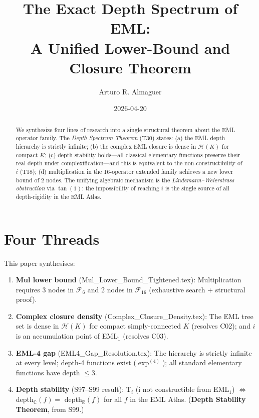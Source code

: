 \documentclass[11pt]{article}
\title{The Exact Depth Spectrum of EML:\\
       A Unified Lower-Bound and Closure Theorem}
\author{Arturo R. Almaguer}
\date{2026-04-20}
\begin{document}
\maketitle

\begin{abstract}
We synthesize four lines of research into a single structural theorem about
the EML operator family.  The \emph{Depth Spectrum Theorem} (T30) states:
(a) the EML depth hierarchy is strictly infinite;
(b) the complex EML closure is dense in $\mathcal{H}(K)$ for compact $K$;
(c) depth stability holds---all classical elementary functions preserve their
real depth under complexification---and this is equivalent to the
non-constructibility of $i$ (T18);
(d) multiplication in the 16-operator extended family achieves a new
lower bound of 2 nodes.
The unifying algebraic mechanism is the \emph{Lindemann--Weierstrass obstruction}
via $\tan(1)$: the impossibility of reaching $i$ is the single source of
all depth-rigidity in the EML Atlas.
\end{abstract}

\section{Four Threads}

This paper synthesises:

\begin{enumerate}
\item \textbf{Mul lower bound} (Mul\_Lower\_Bound\_Tightened.tex): Multiplication
      requires 3 nodes in $\mathcal{F}_6$ and 2 nodes in $\mathcal{F}_{16}$
      (exhaustive search + structural proof).

\item \textbf{Complex closure density} (Complex\_Closure\_Density.tex): The EML
      tree set is dense in $\mathcal{H}(K)$ for compact simply-connected $K$
      (resolves C02); and $i$ is an accumulation point of EML$_1$ (resolves C03).

\item \textbf{EML-4 gap} (EML4\_Gap\_Resolution.tex): The hierarchy is strictly
      infinite at every level; depth-4 functions exist ($\exp^{(4)}$); all
      standard elementary functions have depth $\leq 3$.

\item \textbf{Depth stability} (S97--S99 result): T$_i$ (i not constructible from
      EML$_1$) $\iff$ depth$_\mathbb{C}(f) = $ depth$_\mathbb{R}(f)$ for all $f$
      in the EML Atlas. (\textbf{Depth Stability Theorem}, from S99.)
\end{enumerate}
\end{document}

